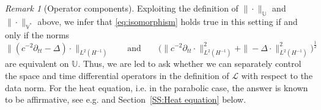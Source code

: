 \documentclass{amsart}
\theoremstyle{plain}
\theoremstyle{remark}
\newtheorem{remark}[theorem]{Remark}
\numberwithin{equation}{section}
\numberwithin{theorem}{section}
\newcommand{\trial}{\mathbb{U}}
\newcommand{\data}{\mathbb{V}^*}
\begin{document}
\begin{remark}[Operator components]
\label{rem:OperatorComponents}
    Exploiting the definition of $\|\cdot\|_\trial$ and $\|\cdot\|_{\data}$ above, we infer that \eqref{eq:isomorphism} holds true in this setting if and only if the norms
    \begin{equation*}
        \|(c^{-2}\partial_{tt} - \Delta) \cdot\|_{L^2(H^{-1})}
        \qquad \text{and} \qquad
        \Big(\|c^{-2}\partial_{tt} \cdot\|^2_{L^2(H^{-1})} + \|-\Delta \cdot\|^2_{L^2(H^{-1})}\Big)^{\frac{1}{2}}
    \end{equation*}
    are equivalent on $\trial$. Thus, we are led to ask whether we can separately control the space and time differential operators in the definition of $\mathcal{L}$ with respect to the data norm. For the heat equation, i.e. in the parabolic case, the answer is known to be affirmative, see e.g. \cite[Section 65]{Ern.Guermond:21-III} and Section~\ref{SS:Heat equation} below. 
\end{remark}
\end{document}
